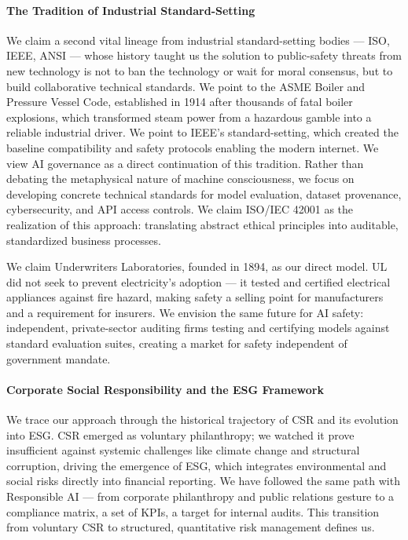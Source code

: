 \paragraph{The Tradition of Industrial
Standard-Setting}\label{the-tradition-of-industrial-standard-setting}

We claim a second vital lineage from industrial standard-setting bodies
--- ISO, IEEE, ANSI --- whose history taught us the solution to
public-safety threats from new technology is not to ban the technology
or wait for moral consensus, but to build collaborative technical
standards. We point to the ASME Boiler and Pressure Vessel Code,
established in 1914 after thousands of fatal boiler explosions, which
transformed steam power from a hazardous gamble into a reliable
industrial driver. We point to IEEE's standard-setting, which created
the baseline compatibility and safety protocols enabling the modern
internet. We view AI governance as a direct continuation of this
tradition. Rather than debating the metaphysical nature of machine
consciousness, we focus on developing concrete technical standards for
model evaluation, dataset provenance, cybersecurity, and API access
controls. We claim ISO/IEC 42001 as the realization of this approach:
translating abstract ethical principles into auditable, standardized
business processes.

We claim Underwriters Laboratories, founded in 1894, as our direct
model. UL did not seek to prevent electricity's adoption --- it tested
and certified electrical appliances against fire hazard, making safety a
selling point for manufacturers and a requirement for insurers. We
envision the same future for AI safety: independent, private-sector
auditing firms testing and certifying models against standard evaluation
suites, creating a market for safety independent of government mandate.

\paragraph{Corporate Social Responsibility and the ESG
Framework}\label{corporate-social-responsibility-and-the-esg-framework}

We trace our approach through the historical trajectory of CSR and its
evolution into ESG. CSR emerged as voluntary philanthropy; we watched it
prove insufficient against systemic challenges like climate change and
structural corruption, driving the emergence of ESG, which integrates
environmental and social risks directly into financial reporting. We
have followed the same path with Responsible AI --- from corporate
philanthropy and public relations gesture to a compliance matrix, a set
of KPIs, a target for internal audits. This transition from voluntary
CSR to structured, quantitative risk management defines us.

